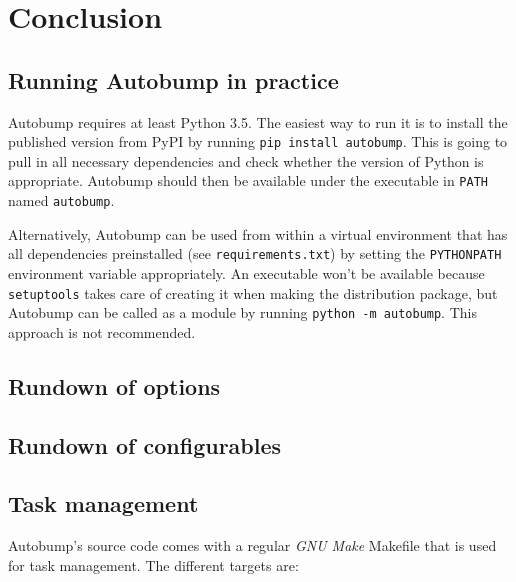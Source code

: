 \documentclass{l4proj}
\newcommand\genericstyle{\lstset{basicstyle=\ttm}}
\newcommand\codeinline[1]{{\genericstyle\lstinline!#1!}}
\begin{document}

\chapter{Conclusion}
\label{Conclusion}


\begin{appendices}

\chapter{Running Autobump in practice}
\label{AutobumpInPractice}

Autobump requires at least Python 3.5. The easiest way to run it is to
install the published version from PyPI by running \codeinline{pip
install autobump}. This is going to pull in all necessary dependencies
and check whether the version of Python is appropriate. Autobump
should then be available under the executable in \codeinline{PATH}
named \codeinline{autobump}.

Alternatively, Autobump can be used from within a virtual environment
that has all dependencies preinstalled (see
\codeinline{requirements.txt}) by setting the \codeinline{PYTHONPATH}
environment variable appropriately. An executable won't be available
because \codeinline{setuptools} takes care of creating it when making
the distribution package, but Autobump can be called as a module by
running \codeinline{python -m autobump}. This approach is not recommended.

\section{Rundown of options}
\label{RundownOptions}

\section{Rundown of configurables}
\label{RundownConfigurables}

\section{Task management}

Autobump's source code comes with a regular \textit{GNU Make} Makefile
that is used for task management. The different targets are:


\end{appendices}
\end{document}
